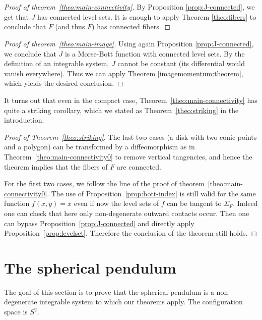 \documentclass[11pt]{article}
\begin{document}
\begin{proof}[Proof of theorem~\ref{theo:main-connectivity}]
  By Proposition \ref{prop:J-connected}, we get that $J$ has connected
  level sets.  It is enough to apply Theorem \ref{theo:fibers} to
  conclude that $\tilde{F}$ (and thus $F$) has connected fibers.
\end{proof}

\begin{proof}[Proof of theorem~\ref{theo:main-image}]
  Using again Proposition \ref{prop:J-connected}, we conclude that $J$
  is a Morse-Bott function with connected level sets.  By the
  definition of an integrable system, $J$ cannot be constant (its
  differential would vanish everywhere). Thus we can apply Theorem
  \ref{imagemomentum:theorem}, which yields the desired conclusion.
\end{proof}


It turns out that even in the compact case,
Theorem~\ref{theo:main-connectivity} has quite a striking corollary,
which we stated as Theorem~\ref{theo:striking} in the introduction.

\begin{proof}[Proof of Theorem~\ref{theo:striking}]
  The last two cases (a disk with two conic points and a polygon) can
  be transformed by a diffeomorphism as in
  Theorem~\ref{theo:main-connectivity0} to remove vertical tangencies,
  and hence the theorem implies that the fibers of $F$ are connected.

  For the first two cases, we follow the line of the proof of
  theorem~\ref{theo:main-connectivity0}. The use of
  Proposition~\ref{prop:bott-index} is still valid for the same
  function $f(x,y)=x$ even if now the level sets of $f$ can be tangent
  to $\Sigma_F$. Indeed one can check that here only non-degenerate
  outward contacts occur. Then one can bypass
  Proposition~\ref{prop:J-connected} and directly apply
  Proposition~\ref{prop:levelset}. Therefore the conclusion of the
  theorem still holds.
\end{proof}




\section{The spherical pendulum} \label{sp:section}

The goal of this section is to prove that the spherical pendulum is a
non-degenerate integrable system to which our theorems apply. The
configuration space is $S^2$.
\end{document}
